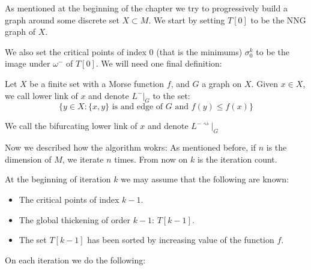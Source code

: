 As mentioned at the beginning of the chapter we try to progressively build a 
graph around some discrete set $X\subset M$. We start by setting
$T[0]$ to be the NNG graph of $X$.

We also set the critical points of index $0$ (that is the minimums) 
$\sigma_0^k$ to be the image under $\omega^-$
of $T[0]$.
We will need one final definition:

\begin{definition}
    Let $X$ be a finite set with a Morse function $f$, and $G$ a graph on $X$.
    Given $x\in X$, we call lower link of $x$ and denote $L^-\vert_G$ to the 
    set:
    $$
        \{y\in X: \{x,y\} \text{ is and edge of } G \text{ and } f(y)\leq f(x)\}
    $$
    
    We call the bifurcating lower link of $x$ and denote $L^{-\rightsquigarrow}\vert_G$
\end{definition}


Now we described how the algorithm wokrs:
As mentioned before, if $n$ is the dimension of $M$,
we iterate $n$ times. 
From now on $k$ is the iteration count.

At the beginning of iteration $k$ we may assume 
that the following are known:

\begin{itemize}
    \item The critical points of index $k-1$.

    \item The global thickening of order $k-1$: $T[k-1]$.

    \item The set $T[k-1]$ has been sorted by increasing value of the function $f$.
\end{itemize}

On each iteration we do the following:



